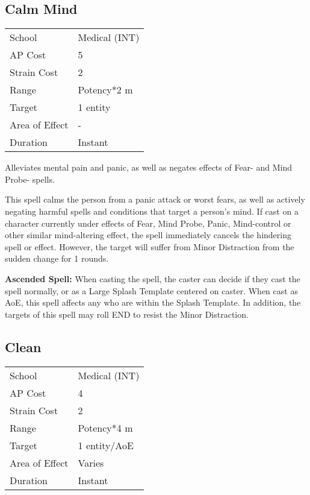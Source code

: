 \documentclass[11pt,a4paper,twocolumn]{book}
\begin{document}

\subsection*{Calm Mind}
{
	\begin{tabu} to 75mm{| X[l,4] | X[l,7] |}
		\hline
		School 			& Medical (INT) 		\\
		AP Cost	      	& 5 					\\
		Strain Cost     & 2 					\\
		Range     		& Potency*2 m			\\
		Target      	& 1 entity 				\\
		Area of Effect  & - 	 				\\
		Duration     	& Instant				\\ \hline
	\end{tabu}
	
}

\medskip

Alleviates mental pain and panic, as well as negates effects of Fear- and Mind Probe- spells.

This spell calms the person from a panic attack or worst fears, as well as actively negating harmful spells and conditions that target a person's mind. If cast on a character currently under effects of Fear, Mind Probe, Panic, Mind-control or other similar mind-altering effect, the spell immediately cancels the hindering spell or effect. However, the target will suffer from Minor Distraction from the sudden change for 1 rounds.

\bigskip

\textbf{Ascended Spell:} When casting the spell, the caster can decide if they cast the spell normally, or as a Large Splash Template centered on caster. When cast as AoE, this spell affects any who are within the Splash Template. In addition, the targets of this spell may roll END to resist the Minor Distraction.

\vfill

\subsection*{Clean}
{
	\begin{tabu} to 75mm{| X[l,4] | X[l,7] |}
		\hline
		School 			& Medical (INT) 		\\
		AP Cost	      	& 4 					\\
		Strain Cost     & 2 					\\
		Range     		& Potency*4 m			\\
		Target      	& 1 entity/AoE 			\\
		Area of Effect  & Varies 	 		\\
		Duration     	& Instant 				\\ \hline
	\end{tabu}
	
}
\end{document}
